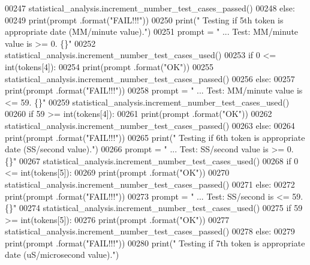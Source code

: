 \begin{DoxyCode}
00247             statistical\_analysis.increment\_number\_test\_cases\_passed()
00248         \textcolor{keywordflow}{else}:
00249             print(prompt .format(\textcolor{stringliteral}{"FAIL!!!"}))
00250         print(\textcolor{stringliteral}{" Testing if 5th token is appropriate date (MM/minute value)."})
00251         prompt = \textcolor{stringliteral}{"  ... Test: MM/minute value is >= 0.          \{\}"}
00252         statistical\_analysis.increment\_number\_test\_cases\_used()
00253         \textcolor{keywordflow}{if} 0 <= int(tokens[4]):
00254             print(prompt .format(\textcolor{stringliteral}{"OK"}))
00255             statistical\_analysis.increment\_number\_test\_cases\_passed()
00256         \textcolor{keywordflow}{else}:
00257             print(prompt .format(\textcolor{stringliteral}{"FAIL!!!"}))
00258         prompt = \textcolor{stringliteral}{"  ... Test: MM/minute value is <= 59.         \{\}"}
00259         statistical\_analysis.increment\_number\_test\_cases\_used()
00260         \textcolor{keywordflow}{if} 59 >= int(tokens[4]):
00261             print(prompt .format(\textcolor{stringliteral}{"OK"}))
00262             statistical\_analysis.increment\_number\_test\_cases\_passed()
00263         \textcolor{keywordflow}{else}:
00264             print(prompt .format(\textcolor{stringliteral}{"FAIL!!!"}))
00265         print(\textcolor{stringliteral}{" Testing if 6th token is appropriate date (SS/second value)."})
00266         prompt = \textcolor{stringliteral}{"  ... Test: SS/second value is >= 0.          \{\}"}
00267         statistical\_analysis.increment\_number\_test\_cases\_used()
00268         \textcolor{keywordflow}{if} 0 <= int(tokens[5]):
00269             print(prompt .format(\textcolor{stringliteral}{"OK"}))
00270             statistical\_analysis.increment\_number\_test\_cases\_passed()
00271         \textcolor{keywordflow}{else}:
00272             print(prompt .format(\textcolor{stringliteral}{"FAIL!!!"}))
00273         prompt = \textcolor{stringliteral}{"  ... Test: SS/second is <= 59.               \{\}"}
00274         statistical\_analysis.increment\_number\_test\_cases\_used()
00275         \textcolor{keywordflow}{if} 59 >= int(tokens[5]):
00276             print(prompt .format(\textcolor{stringliteral}{"OK"}))
00277             statistical\_analysis.increment\_number\_test\_cases\_passed()
00278         \textcolor{keywordflow}{else}:
00279             print(prompt .format(\textcolor{stringliteral}{"FAIL!!!"}))
00280         print(\textcolor{stringliteral}{" Testing if 7th token is appropriate date (uS/microsecond value)."})

\end{DoxyCode}
